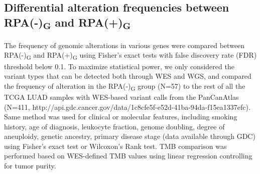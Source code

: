 \documentclass[phd,tocprelim]{cornell}
\begin{document}
\subsection*{Differential alteration frequencies between RPA(-)\textsubscript{G} and RPA(+)\textsubscript{G}}
The frequency of genomic alterations in various genes were compared between RPA(-)\textsubscript{G} and RPA(+)\textsubscript{G} using Fisher’s exact tests with false discovery rate (FDR) threshold below 0.1. To maximize statistical power, we only considered the variant types that can be detected both through WES and WGS, and compared the frequency of alteration in the RPA(-)\textsubscript{G} group (N=57) to the rest of all the TCGA LUAD samples with WES-based variant calls from the PanCanAtlas (N=411, http://api.gdc.cancer.gov/data/1c8cfe5f-e52d-41ba-94da-f15ea1337efc). Same method was used for clinical or molecular features, including smoking history, age of diagnosis, leukocyte fraction, genome doubling, degree of aneuploidy, genetic ancestry, primary disease stage (data available through GDC) using Fisher’s exact test or Wilcoxon’s Rank test. TMB comparison was performed based on WES-defined TMB values using linear regression controlling for tumor purity.

\end{document}
